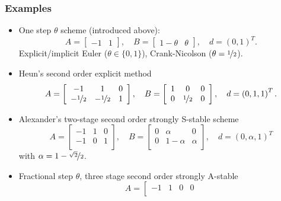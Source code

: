 \documentclass[aspectratio=169,11pt]{beamer}
\theoremstyle{definition}
\begin{document}
\begin{frame}
\frametitle{Examples}
\begin{itemize}
\item One step $\theta$ scheme (introduced above):
\begin{equation*}
A = \left[\begin{array}{cc}
-1 & 1
\end{array}\right],
\quad B = \left[\begin{array}{cc}
1-\theta & \theta
\end{array}\right],
\quad d = \left(
0, 1
\right)^T.
\end{equation*}
Explicit/implicit Euler ($\theta\in\{0,1\}$), Crank-Nicolson ($\theta=\nicefrac12$).
\item Heun's second order explicit method
\begin{equation*}
A = \left[\begin{array}{ccc}
-1 & 1 & 0\\
-\nicefrac12 & -\nicefrac12 & 1\\
\end{array}\right],
\quad B = \left[\begin{array}{ccc}
1 & 0 & 0\\
0 & \nicefrac12 & 0\\
\end{array}\right],
\quad d = \left(
0, 1, 1
\right)^T.
\end{equation*}
\item Alexander's two-stage second order strongly S-stable scheme
{\footnotesize\begin{equation*}
A = \left[\begin{array}{ccc}
-1 & 1 & 0\\
-1 & 0 & 1\\
\end{array}\right],
\quad B = \left[\begin{array}{ccc}
0 & \alpha     & 0\\
0 & 1-\alpha & \alpha\\
\end{array}\right],
\quad d = \left(
0, \alpha, 1
\right)^T
\end{equation*}}
with $\alpha=1-\nicefrac{\sqrt{2}}{2}$.
\item Fractional step $\theta$, three stage second order strongly A-stable
{\footnotesize\begin{equation*}
A = \left[\begin{array}{rrrr}
-1 & 1 & 0 & 0\\

\end{array}
\end{equation*}}
\end{itemize}
\end{frame}
\end{document}
